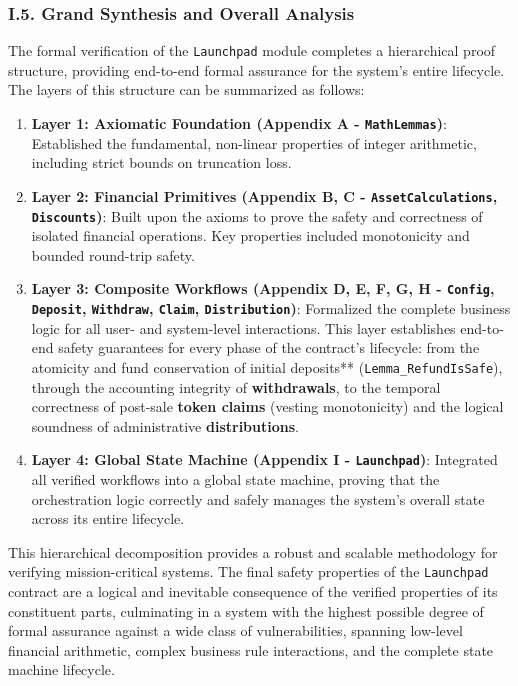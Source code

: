 \documentclass[
  english,
  onecolumn]{article}
\providecommand{\tightlist}{%
  \setlength{\itemsep}{0pt}\setlength{\parskip}{0pt}}
\begin{document}
\subsubsection{I.5. Grand Synthesis and Overall
Analysis}\label{i.5.-grand-synthesis-and-overall-analysis}

The formal verification of the \texttt{Launchpad} module completes a
hierarchical proof structure, providing end-to-end formal assurance for
the system's entire lifecycle. The layers of this structure can be
summarized as follows:

\begin{enumerate}
\def\labelenumi{\arabic{enumi}.}
\tightlist
\item
  \textbf{Layer 1: Axiomatic Foundation (Appendix A -
  \texttt{MathLemmas})}: Established the fundamental, non-linear
  properties of integer arithmetic, including strict bounds on
  truncation loss.
\item
  \textbf{Layer 2: Financial Primitives (Appendix B, C -
  \texttt{AssetCalculations}, \texttt{Discounts})}: Built upon the
  axioms to prove the safety and correctness of isolated financial
  operations. Key properties included monotonicity and bounded
  round-trip safety.
\item
  \textbf{Layer 3: Composite Workflows (Appendix D, E, F, G, H -
  \texttt{Config}, \texttt{Deposit}, \texttt{Withdraw}, \texttt{Claim},
  \texttt{Distribution})}: Formalized the complete business logic for
  all user- and system-level interactions. This layer establishes
  end-to-end safety guarantees for every phase of the contract's
  lifecycle: from the atomicity and fund conservation of initial \emph{
  }deposits** (\texttt{Lemma\_RefundIsSafe}), through the accounting
  integrity of \textbf{withdrawals}, to the temporal correctness of
  post-sale \textbf{token claims} (vesting monotonicity) and the logical
  soundness of administrative \textbf{distributions}.
\item
  \textbf{Layer 4: Global State Machine (Appendix I -
  \texttt{Launchpad})}: Integrated all verified workflows into a global
  state machine, proving that the orchestration logic correctly and
  safely manages the system's overall state across its entire lifecycle.
\end{enumerate}

This hierarchical decomposition provides a robust and scalable
methodology for verifying mission-critical systems. The final safety
properties of the \texttt{Launchpad} contract are a logical and
inevitable consequence of the verified properties of its constituent
parts, culminating in a system with the highest possible degree of
formal assurance against a wide class of vulnerabilities, spanning
low-level financial arithmetic, complex business rule interactions, and
the complete state machine lifecycle.
\end{document}
